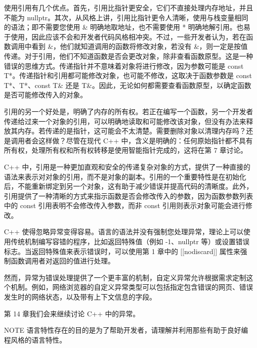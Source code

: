 使用引用有几个优点。首先，引用比指针更安全，它们不直接处理内存地址，并且不能为 nullptr。其次，从风格上讲，引用比指针更令人清晰，使用与栈变量相同的语法；即不需要您使用 \& 明确地取地址，也不需要使用 * 明确地解引用。也易于使用，因此应该不会和开发者代码风格相冲突。不过，一些开发者认为，若在函数调用中看到 \&，他们就知道调用的函数将修改对象，若没有 \&，则一定是按值传递。对于引用，他们不知道函数是否会更改对象，除非查看函数原型。这是一种错误的思维方式。传递指针并不意味着对象将进行修改，因为参数可能是 const T*。传递指针和引用都可能修改对象，也可能不修改，这取决于函数参数是 const T*、T*、const T\& 还是 T\&。因此，无论如何都需要查看函数原型，以确定函数是否可能修改传入的对象。

引用的另一个好处是，明确了内存的所有权。若正在编写一个函数，另一个开发者传递给过来一个对象的引用，可以明确地读取和可能修改该对象，但没有办法来释放其内存。若传递的是指针，这可能会不太清楚。需要删除对象以清理内存吗？还是调用者会这样做？尽管在现代 C++ 中，含义是明确的：任何原始指针都不具有所有权，处理所有权和所有权转移是使用智能指针完成的，这将在第 7 章讨论。

C++ 中，引用是一种更加直观和安全的传递复杂对象的方式，提供了一种直接的语法来表示对对象的引用，而不是对象的副本。引用的一个重要特性是在初始化后，不能重新绑定到另一个对象，这有助于减少错误并提高代码的清晰度。此外，引用提供了一种清晰的方式来指示函数是否会修改传入的参数，因为函数参数列表中的 const 引用表明不会修改传入参数，而非 const 引用则表示对象可能会进行修改。


C++ 使得忽略异常变得容易。语言的语法并没有强制您处理异常，理论上可以使用传统机制编写容错的程序，比如返回特殊值（例如 -1、nullptr 等）或设置错误标志。当返回特殊值来表示错误时，可以使用第 1 章中的 [[nodiscard]] 属性来强制函数调用者对返回的值进行处理。

然而，异常为错误处理提供了一个更丰富的机制，自定义异常允许根据需求定制这个机制。例如，网络浏览器的自定义异常类型可以包括指定包含错误的网页、错误发生时的网络状态，以及带有上下文信息的字段。

第 14 章我们会来继续讨论 C++ 中的异常。

\begin{myNotic}{NOTE}
语言特性存在的目的是为了帮助开发者，请理解并利用那些有助于良好编程风格的语言特性。
\end{myNotic}












